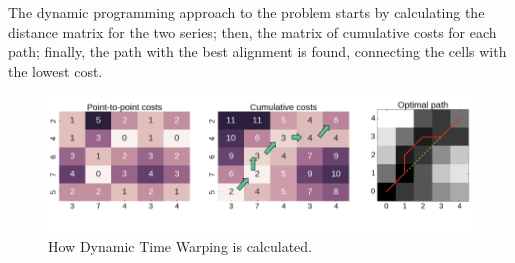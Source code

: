 The dynamic programming approach to the problem starts by calculating the distance matrix for the two series; then, the matrix of cumulative costs for each path; finally, the path with the best alignment is found, connecting the cells with the lowest cost.
\begin{figure}[h]
    \centering
    \includegraphics[width=1.0\linewidth]{img/dtw.png}
    \caption{How Dynamic Time Warping is calculated.}
    \label{fig:dtw}
\end{figure}